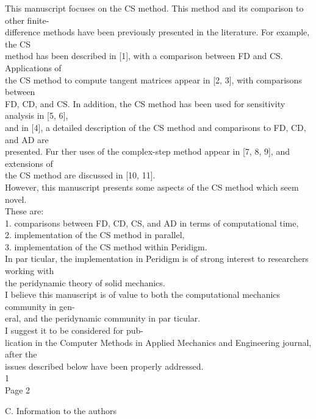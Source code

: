This manuscript focuses on the CS method. This method and its comparison
to other ﬁnite- \\difference methods have been previously presented in
the literature. For example, the CS \\method has been described in
{[}1{]}, with a comparison between FD and CS. Applications of \\the CS
method to compute tangent matrices appear in {[}2, 3{]}, with
comparisons between \\FD, CD, and CS. In addition, the CS method has
been used for sensitivity analysis in {[}5, 6{]}, \\and in {[}4{]}, a
detailed description of the CS method and comparisons to FD, CD, and AD
are \\presented. Fur ther uses of the complex-step method appear in
{[}7, 8, 9{]}, and extensions of \\the CS method are discussed in {[}10,
11{]}. \\However, this manuscript presents some aspects of the CS method
which seem novel. \\These are: \\

1. comparisons between FD, CD, CS, and AD in terms of computational
time, \\2. implementation of the CS method in parallel, \\3.
implementation of the CS method within Peridigm. \\

In par ticular, the implementation in Peridigm is of strong interest to
researchers working with \\the peridynamic theory of solid mechanics.
\\I believe this manuscript is of value to both the computational
mechanics community in gen- \\eral, and the peridynamic community in par
ticular. \\I suggest it to be considered for pub- \\lication in the
Computer Methods in Applied Mechanics and Engineering journal, after the
\\issues described below have been properly addressed. \\

1 \\

Page 2

C. Information to the authors \\

